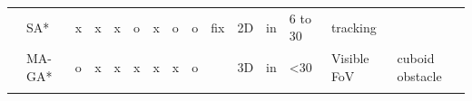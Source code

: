 \begin{landscape}
\begin{table}[]
\begin{tabular}{@{}  l|p{1.6cm} p{1.7cm} l  l p{0.659cm} p{0.612cm}p{.659cm} p{1.11cm} p{1.5cm} p{1.57cm}p{0.9cm}p{1.6cm}p{1.3cm}p{1.2cm} p{1.2cm}@{}}
\multicolumn{1}{l|}{\cellcolor[HTML]{FFFFFF}\cite{151*zhao2013}} & SA*                                                                                                            & x                                                                     & x                                              & x                                              & o                                              & x                                                & o                                                 & o                                                 & fix                                                       & 2D                                                                                                              & in                                                           & 6 to 30                                                                                                   & tracking                                                                                                                    &                               &                                  \\
\rowcolor[HTML]{EFEFEF} 
\multicolumn{1}{l|}{\cellcolor[HTML]{EFEFEF}\cite{152*wang2009}} & MA-GA*                                                                                                         & o                                                                     & x                                              & x                                              & x                                              & x                                                & x                                                 & o                                                 &                                                           & 3D                                                                                                              & in                                                           & \textless30                                                                                               & Visible FoV                                                                                                                 & \multicolumn{2}{l}{\cellcolor[HTML]{EFEFEF}cuboid obstacle}      \\
\rowcolor[HTML]{FFFFFF} 

\end{tabular}
\end{table}
\end{landscape}
